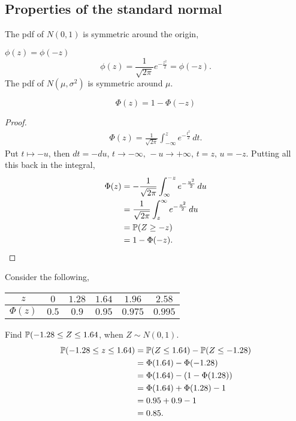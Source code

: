 \documentclass[10pt, a4paper]{article}
\begin{document}
\subsection{Properties of the standard normal}

The pdf of $N(0, 1)$ is symmetric around the origin,

$\phi(z) = \phi(-z)$
\[
\phi(z) = \frac{1}{\sqrt{2\pi}}e ^ {-\frac{z ^ 2}{2}} = \phi(-z).
\]
The pdf of $N(\mu, \sigma ^ 2)$ is symmetric around $\mu$.

\begin{theorem}
    \[
    \Phi(z) = 1 - \Phi(-z)
    \]
    \begin{proof}
        \begin{align*}
            \Phi(z) = \frac{1}{\sqrt{2\pi}}\int_{-\infty}^{z}e ^ {-\frac{t ^ 2}{2}}\,dt.
        \end{align*}
        Put $t \mapsto -u$,
        then $dt = -du$,
        $t \rightarrow -\infty,\, -u \rightarrow +\infty$,
        $t = z,\, u = -z$.
        Putting all this back in the integral,
        \begin{align*}
            \Phi(z) &= -\frac{1}{\sqrt{2\pi}}\int_{\infty}^{-z}e ^ {-\frac{u ^ 2}{2}}\,du \\
            &= \frac{1}{\sqrt{2\pi}}\int_{z}^{\infty}e ^ {-\frac{u ^ 2}{2}}\,du \\
            &= \P(Z \geq -z) \\
            &= 1 - \Phi(-z).
        \end{align*}
    \end{proof}
\end{theorem}

\begin{example}
    Consider the following,
    \begin{table}[H]
        \centering
        \begin{tabular}{c|ccccc}
             $z$ & $0$ & $1.28$ & $1.64$ & $1.96$ & $2.58$  \\
             \hline
             $\Phi(z)$ & $0.5$ & $0.9$ & $0.95$ & $0.975$ & $0.995$
        \end{tabular}
    \end{table}
    Find $\P(-1.28 \leq Z \leq 1.64$,
    when $Z \sim N(0, 1)$.
    \begin{align*}
        \P(-1.28 \leq z \leq 1.64) &= \P(Z \leq 1.64) - \P(Z \leq -1.28) \\
        &= \Phi(1.64) - \Phi(-1.28) \\
        &= \Phi(1.64) - (1 - \Phi(1.28)) \\
        &= \Phi(1.64) + \Phi(1.28) - 1 \\
        &= 0.95 + 0.9 - 1 \\
        &= 0.85.
    \end{align*}
\end{example}
\end{document}
